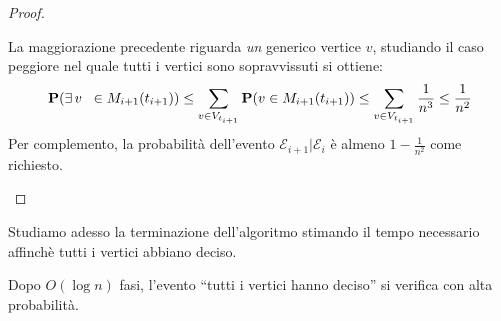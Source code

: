 \documentclass{article}
\begin{document}
\begin{proof}
\begin{itemize}
\begin{displaymath}
    \end{displaymath}
    La maggiorazione precedente riguarda \emph{un}
    generico vertice $v$, studiando il caso peggiore nel quale tutti i 
    vertici sono sopravvissuti si ottiene:
    \begin{displaymath}
        \mathbf{P}(\exists\,v\;\; \in M_{i+1}(t_{i+1})) \leq 
        \sum_{v \in V_{t_{i+1}}}{\mathbf{P}(v \in M_{i+1}(t_{i+1}))} \leq
        \sum_{v \in V_{t_{i+1}}}{\frac{1}{n^3}} \leq
        \frac{1}{n^2}
    \end{displaymath}
    Per complemento, la probabilit\`a dell'evento $\mathcal{E}_{i+1}|
    \mathcal{E}_i$ \`e almeno $1 - \frac{1}{n^2}$ come richiesto.
\end{itemize}
\end{proof}

Studiamo adesso la terminazione dell'algoritmo stimando il tempo necessario
affinch\`e tutti i vertici abbiano deciso.

\begin{theorem}
    Dopo $O(\log{n})$ fasi, l'evento ``tutti i vertici hanno deciso''
    si verifica con alta probabilit\`a.
\end{theorem}
\end{document}

